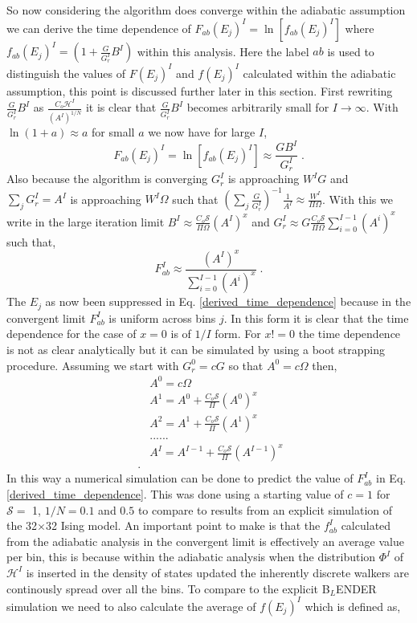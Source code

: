 \documentclass[aps,pre,reprint,superscriptaddress,showkeys]{revtex4-2}
\begin{document}
   So now considering the algorithm does converge within the adiabatic assumption  we can derive the time dependence of $F_{ab}(E_j)^I=\ln[f_{ab}(E_j)^I]$ where $f_{ab}(E_j)^I = (1 + \frac{G}{G_r^I}B^I)$ within this analysis. Here the label $ab$ is used to distinguish the values of $F(E_j)^I$ and $f(E_j)^I$ calculated within the adiabatic assumption, this point is discussed further later in this section.  First rewriting $\frac{G}{G_r^I}B^I$ as $\frac{C_o\mathcal{H}^I}{(A^I)^{1/N}}$ it is clear that $\frac{G}{G_r^I}B^I$ becomes arbitrarily small for $I \rightarrow \infty$. With  $\ln(1+a) \approx a$ for small $a$ we now have for large $I$, 
\begin{equation}
F_{ab}(E_j)^I= \ln[f_{ab}(E_j)^I] \approx  \frac{GB^I}{G_r^I} \;.
\label{TD}
\end{equation}
  Also because the algorithm is converging $G_r^I$ is approaching $W^IG$ and $\sum_j G_r^I = A^I$ is approaching $W^I\Omega$ such that $(\sum_{j}\frac{G}{G_r^{I}})^{-1} \frac{1}{A^I}\approx \frac{W^I}{\Pi\Omega}$. With this we write  in the large iteration limit $B^I \approx  \frac{C_o\mathcal{S}}{\Pi\Omega}(A^I)^x$ and $G_r^I \approx G \frac{C_o\mathcal{S}}{\Pi\Omega}\sum_{i=0}^{I-1}(A^i)^x$ such that, 
\begin{equation}
F_{ab}^I \approx \frac{(A^I)^x}{\sum_{i=0}^{I-1}(A^i)^x} \;.
\label{derived_time_dependence}
\end{equation}
The $E_j$ as now been suppressed in Eq. \ref{derived_time_dependence} because in the convergent limit $F_{ab}^I$ is uniform across bins $j$.
In this form it is clear that the time dependence for the case of $x=0$ is of $1/I$ form. For $x != 0$ the time dependence is not as clear analytically but it can be simulated by using a boot strapping procedure. Assuming we start with $G_r^0=cG$ so that $A^0=c\Omega$ then, 
\begin{equation}
\begin{split}
&A^0=c\Omega\\
&A^1 = A^0     +  \frac{C_o\mathcal{S}}{\Pi}(A^0)^x\\
&A^2 = A^1     +  \frac{C_o\mathcal{S}}{\Pi}(A^1)^x\\
&......\\
&A^I = A^{I-1} +  \frac{C_o\mathcal{S}}{\Pi}(A^{I-1})^x\\\;.
\end{split}
\label{bootstrap}
\end{equation} 
In this way a numerical simulation can be done to predict the value of $F_{ab}^I$ in Eq. \ref{derived_time_dependence}. This was done using a starting value of $c=1$ for $\mathcal{S}=$ 1,  $1/N = 0.1$ and $0.5$ to compare to results from an explicit simulation of the 32$\times$32 Ising model. An important point to make is that the $f_{ab}^I$ calculated from the adiabatic analysis in the convergent limit is effectively an average value per bin, this is because within the adiabatic analysis when the distribution $\Phi^I$ of $\mathcal{H}^I$ is inserted in the density of states updated  the inherently discrete walkers are  continously spread over all the bins.  To compare to the explicit B$_L$ENDER simulation we need to also calculate the average of $f(E_j)^I$ which is defined as,
\end{document}
